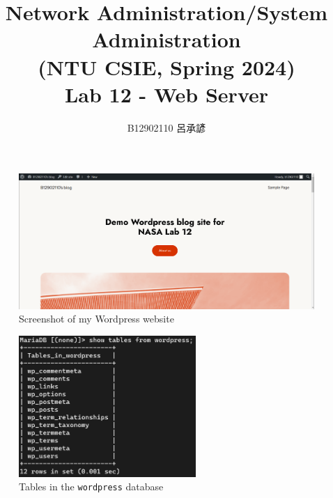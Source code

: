 \documentclass[12pt, a4paper]{article}
\title{
  \vspace{-1cm}
  Network Administration/System Administration\\
  (NTU CSIE, Spring 2024)\\
  Lab 12 - Web Server
}
\author{\Large B12902110 呂承諺}
\begin{document}
  \maketitle
  \begin{figure}[H]
    \centering
    \includegraphics[width=\textwidth]{site.png}
    \caption{Screenshot of my Wordpress website}
  \end{figure}
  \begin{figure}[H]
    \centering
    \includegraphics[width=0.6\textwidth]{tables.png}
    \caption{Tables in the \texttt{wordpress} database}
  \end{figure}
\end{document}
